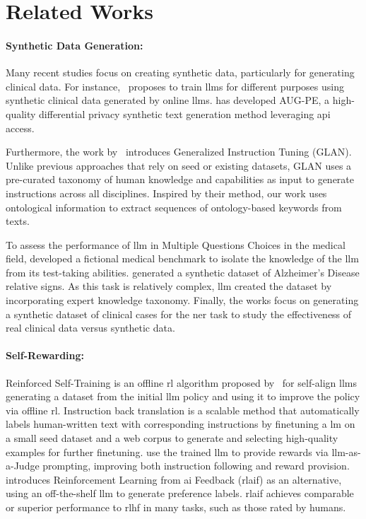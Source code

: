 \section{Related Works}

\paragraph{Synthetic Data Generation:}
Many recent studies focus on creating synthetic data, particularly for generating clinical data. For instance,~\citet{kweon2024asclepius} proposes to train \glspl{llm} for different purposes using synthetic clinical data generated by online \glspl{llm}. \citet{xieDifferentiallyPrivateSynthetic2024} has developed AUG-PE, a high-quality differential privacy synthetic text generation method leveraging \gls{api} access.

Furthermore, the work by~\citet{li_synthetic_2024} introduces Generalized Instruction Tuning (GLAN). Unlike previous approaches that rely on seed or existing datasets, GLAN uses a pre-curated taxonomy of human knowledge and capabilities as input to generate instructions across all disciplines. Inspired by their method, our work uses ontological information to extract sequences of ontology-based keywords from texts.

To assess the performance of \gls{llm} in Multiple Questions Choices in the medical field, \citet{griot_multiple_2024} developed a fictional medical benchmark to isolate the knowledge of the \gls{llm} from its test-taking abilities. \citet{liTwoDirectionsClinical2023} generated a synthetic dataset of Alzheimer's Disease relative signs. As this task is relatively complex, \gls{llm} created the dataset by incorporating expert knowledge taxonomy. Finally, the \citet{hiebelCanSyntheticText2023, xieDifferentiallyPrivateSynthetic2024} works focus on generating a synthetic dataset of clinical cases for the \gls{ner} task to study the effectiveness of real clinical data versus synthetic data.

\paragraph{Self-Rewarding:}
Reinforced Self-Training is an offline \gls{rl} algorithm proposed by~\citet{gulcehre2023rest} for self-align \glspl{llm} generating a dataset from the initial \gls{llm} policy and using it to improve the policy via offline \gls{rl}. Instruction back translation \cite{liSelfAlignmentInstructionBacktranslation2023} is a scalable method that automatically labels human-written text with corresponding instructions by finetuning a \gls{lm} on a small seed dataset and a web corpus to generate and selecting high-quality examples for further finetuning. \citet{yuan2024selfrewarding} use the trained \gls{llm} to provide rewards via \gls{llm}-as-a-Judge prompting, improving both instruction following and reward provision. \citet{lee2023rlaif} introduces Reinforcement Learning from \gls{ai} Feedback (\gls{rlaif}) as an alternative, using an off-the-shelf \gls{llm} to generate preference labels. \gls{rlaif} achieves comparable or superior performance to \gls{rlhf} in many tasks, such as those rated by humans.

